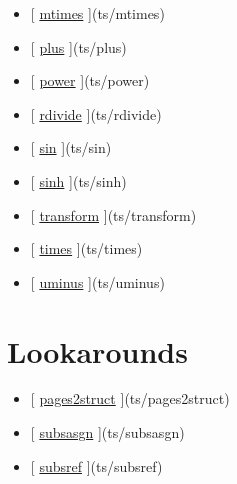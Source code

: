 \documentclass[letterpaper,10pt,english]{sphinxmanual}
\begin{document}
\begin{itemize}
\item {} 
{[} {\hyperref[classes/time_series/@ts/ts:mtimes]{mtimes}} {]}(ts/mtimes)

\item {} 
{[} {\hyperref[classes/time_series/@ts/ts:plus]{plus}} {]}(ts/plus)

\item {} 
{[} {\hyperref[classes/time_series/@ts/ts:power]{power}} {]}(ts/power)

\item {} 
{[} {\hyperref[classes/time_series/@ts/ts:rdivide]{rdivide}} {]}(ts/rdivide)

\item {} 
{[} {\hyperref[classes/time_series/@ts/ts:sin]{sin}} {]}(ts/sin)

\item {} 
{[} {\hyperref[classes/time_series/@ts/ts:sinh]{sinh}} {]}(ts/sinh)

\item {} 
{[} {\hyperref[classes/time_series/@ts/ts:transform]{transform}} {]}(ts/transform)

\item {} 
{[} {\hyperref[classes/time_series/@ts/ts:times]{times}} {]}(ts/times)

\item {} 
{[} {\hyperref[classes/time_series/@ts/ts:uminus]{uminus}} {]}(ts/uminus)

\end{itemize}


\section{Lookarounds}
\label{classes/time_series/@ts/ts:lookarounds}\begin{itemize}
\item {} 
{[} {\hyperref[classes/time_series/@ts/ts:pages2struct]{pages2struct}} {]}(ts/pages2struct)

\item {} 
{[} {\hyperref[classes/time_series/@ts/ts:subsasgn]{subsasgn}} {]}(ts/subsasgn)

\item {} 
{[} {\hyperref[classes/time_series/@ts/ts:subsref]{subsref}} {]}(ts/subsref)

\end{itemize}
\end{document}

